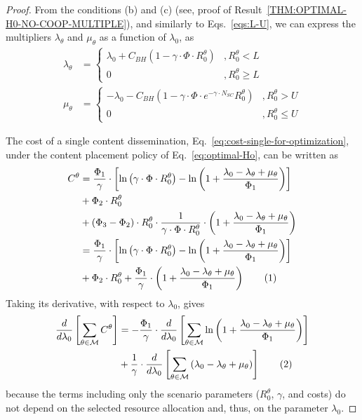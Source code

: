\documentclass[10pt,conference,letterpaper]{IEEEtran}
\newcommand{\eq}[1]{Eq.~\eqref{#1}}
\newcommand{\eqs}[1]{Eqs.~\eqref{#1}}
\newcommand\numberthis{\addtocounter{equation}{1}\tag{\theequation}}
\begin{document}
\begin{proof}
From the conditions (b) and (c) (see, proof of Result~\ref{THM:OPTIMAL-H0-NO-COOP-MULTIPLE}), and similarly to \eqs{eqs:L-U}, we can express the multipliers $\lambda_{\theta}$ and $\mu_{\theta}$ as a function of $\lambda_{0}$, as
\begin{subequations}\label{eqs:langragian-parameters}
 \begin{align}
 \lambda_{\theta} &= \left\{
 \begin{array}{lc}
  \lambda_{0}+C_{BH}\left(1-\gamma\cdot \Phi\cdot R_{0}^{\theta}\right)	&, R_{0}^{\theta}<L\\
  0		&, R_{0}^{\theta}\geq L
 \end{array}
\right. \\
 \mu_{\theta} &= \left\{
 \begin{array}{lc}
  -\lambda_{0}-C_{BH}\left(1-\gamma\cdot\Phi\cdot e^{-\gamma\cdot N_{SC}} R_{0}^{\theta}\right)	& , R_{0}^{\theta}>U\\
  0		& , R_{0}^{\theta}\leq U
 \end{array}
\right. 
\end{align}
\end{subequations}

The cost of a single content dissemination, \eq{eq:cost-single-for-optimization}, under the content placement policy of \eq{eq:optimal-Ho}, can be written as
\begin{align*}
C^{\theta} &= \frac{\Phi_{1}}{\gamma}\cdot\left[\ln\left(\gamma\cdot\Phi\cdot R_{0}^{\theta}\right)-\ln\left(1+\frac{\lambda_{0}-\lambda_{\theta}+\mu_{\theta}}{\Phi_{1}} \right) \right ] \\
	&+ \Phi_{2}\cdot R_{0}^{\theta}\\
	&+(\Phi_{3}-\Phi_{2})\cdot R_{0}^{\theta}\cdot\frac{1}{\gamma\cdot\Phi\cdot R_{0}^{\theta}} \cdot \left(1+\frac{\lambda_{0}-\lambda_{\theta}+\mu_{\theta}}{\Phi_{1}} \right) \\
&= \frac{\Phi_{1}}{\gamma}\cdot\left[\ln\left(\gamma\cdot\Phi\cdot R_{0}^{\theta}\right)-\ln\left(1+\frac{\lambda_{0}-\lambda_{\theta}+\mu_{\theta}}{\Phi_{1}} \right) \right ] \\
	&+ \Phi_{2}\cdot R_{0}^{\theta}+\frac{\Phi_{1}}{\gamma}\cdot \left(1+\frac{\lambda_{0}-\lambda_{\theta}+\mu_{\theta}}{\Phi_{1}} \right)\numberthis
\end{align*}
Taking its derivative, with respect to $\lambda_{0}$, gives
\begin{align*}\label{eq:derivative-cost-lambda}
 \frac{d}{d\lambda_{0}}\left[ \sum_{\theta\in\mathcal{M}}C^{\theta}\right] 
	&=-\frac{\Phi_{1}}{\gamma}\cdot\frac{d}{d\lambda_{0}}\left[\sum_{\theta\in\mathcal{M}}\ln\left(1+\frac{\lambda_{0}-\lambda_{\theta}+\mu_{\theta}}{\Phi_{1}} \right ) \right ] \\
	&+ \frac{1}{\gamma}\cdot\frac{d}{d\lambda_{0}} \left[\sum_{\theta\in\mathcal{M}}\left( \lambda_{0}-\lambda_{\theta}+\mu_{\theta}\right )\right]\numberthis
\end{align*}
because the terms including only the scenario parameters ($R_{0}^{\theta}$, $\gamma$, and costs) do not depend on the selected resource allocation and, thus, on the parameter $\lambda_{0}$.


\end{proof}
\end{document}
